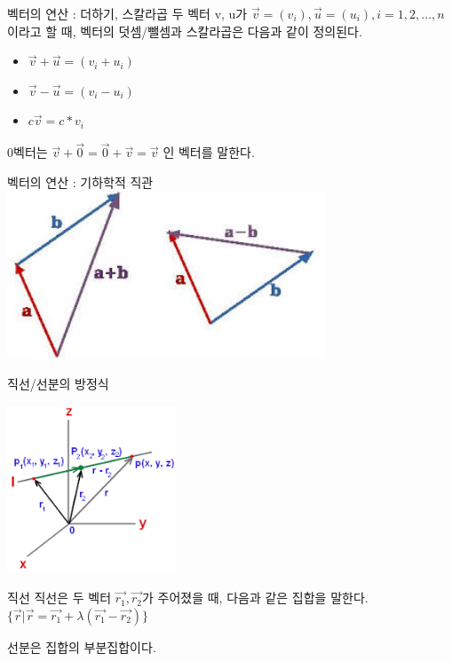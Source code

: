 \documentclass{beamer}
\begin{document}
\begin{frame}{벡터의 연산 : 더하기, 스칼라곱} 
두 벡터 v, u가 $\vec{v} = (v_i), \vec{u} = (u_i), i = 1,2, ..., n$ 이라고 할 때, 벡터의 덧셈/뺄셈과 스칼라곱은 다음과 같이 정의된다. 
\begin{itemize} 
\item $\vec{v} + \vec{u} = (v_i + u_i)$
\item $\vec{v} - \vec{u} = (v_i - u_i)$
\item $c\vec{v} = c*v_i $
\end{itemize}
0벡터는 $\vec{v} + \vec{0} = \vec{0} + \vec{v} = \vec{v}$ 인 벡터를 말한다. 
\end{frame}

\begin{frame}{벡터의 연산 : 기하학적 직관} 
\includegraphics[height=5cm,keepaspectratio]{addition}
\end{frame}

\begin{frame}{직선/선분의 방정식} 


\includegraphics[height=5cm,keepaspectratio]{line}
\begin{block}{직선}
직선은 두 벡터 $\vec{r_1}, \vec{r_2}$가 주어졌을 때, 다음과 같은 집합을 말한다. $\{\vec{r}|\vec{r} = \vec{r_1} + \lambda (\vec{r_1} - \vec{r_2})\}$
\end{block} 

선분은 집합의 부분집합이다. 

\end{frame}
\end{document}
